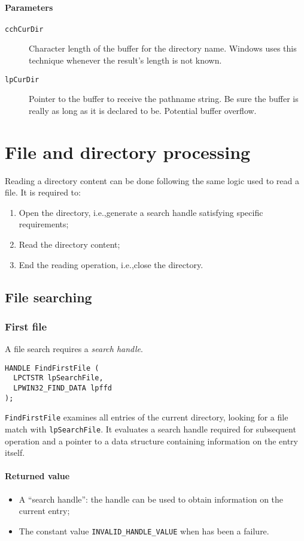 \paragraph{Parameters}
\begin{description}
\item [\texttt{cchCurDir}] Character length of the buffer for the directory name. Windows uses this technique whenever the result's length is not known.
\item [\texttt{lpCurDir}] Pointer to the buffer to receive the pathname string. Be sure the buffer is really as long as it is declared to be. Potential buffer overflow.
\end{description}

\section{File and directory processing}
Reading a directory content can be done following the same logic used to read a file. It is required to:
\begin{enumerate}
\item Open the directory, i.e.,\@ generate a search handle satisfying specific requirements;
\item Read the directory content;
\item End the reading operation, i.e.,\@ close the directory.
\end{enumerate}

\subsection{File searching}
\subsubsection{First file}
A file search requires a \emph{search handle}.
\begin{verbatim}
HANDLE FindFirstFile (
  LPCTSTR lpSearchFile,
  LPWIN32_FIND_DATA lpffd
);
\end{verbatim}
\texttt{FindFirstFile} examines all entries of the current directory, looking for a file match with \texttt{lpSearchFile}. It evaluates a search handle required for subsequent operation and a pointer to a data structure containing information on the entry itself.

\paragraph{Returned value}
\begin{itemize}
\item A ``search handle'': the handle can be used to obtain information on the current entry;
\item The constant value \texttt{INVALID\_HANDLE\_VALUE} when has been a failure.
\end{itemize}

